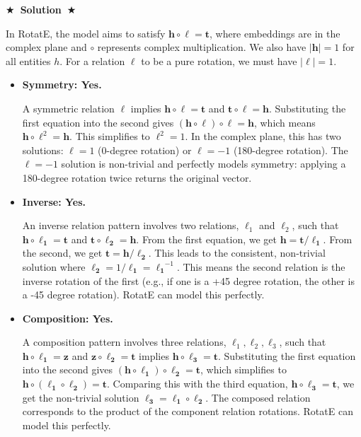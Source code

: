 \documentclass{article}
\numberwithin{figure}{section}
\newcommand{\Solution}[1]{%
    {%
        \medskip
        \color{red}
        \bf $\bigstar$~\sf\textbf{Solution}~$\bigstar$ \sf
        #1
    }
    \bigskip
}
\begin{document}
\Solution{
	In RotatE, the model aims to satisfy $\mathbf{h} \circ \boldsymbol{\ell} = \mathbf{t}$, where embeddings are in the complex plane and $\circ$ represents complex multiplication. We also have $|\mathbf{h}|=1$ for all entities $h$. For a relation $\ell$ to be a pure rotation, we must have $|\boldsymbol{\ell}|=1$.
	
	\begin{itemize}
		\item \textbf{Symmetry: Yes.}
		
		A symmetric relation $\ell$ implies $\mathbf{h} \circ \boldsymbol{\ell} = \mathbf{t}$ and $\mathbf{t} \circ \boldsymbol{\ell} = \mathbf{h}$.
		Substituting the first equation into the second gives $(\mathbf{h} \circ \boldsymbol{\ell}) \circ \boldsymbol{\ell} = \mathbf{h}$, which means $\mathbf{h} \circ \boldsymbol{\ell}^2 = \mathbf{h}$.
		This simplifies to $\boldsymbol{\ell}^2 = 1$. In the complex plane, this has two solutions: $\boldsymbol{\ell} = 1$ (0-degree rotation) or $\boldsymbol{\ell} = -1$ (180-degree rotation). The $\boldsymbol{\ell}=-1$ solution is non-trivial and perfectly models symmetry: applying a 180-degree rotation twice returns the original vector.
		
		\item \textbf{Inverse: Yes.}
		
		An inverse relation pattern involves two relations, $\ell_1$ and $\ell_2$, such that $\mathbf{h} \circ \boldsymbol{\ell_1} = \mathbf{t}$ and $\mathbf{t} \circ \boldsymbol{\ell_2} = \mathbf{h}$.
		From the first equation, we get $\mathbf{h} = \mathbf{t} / \boldsymbol{\ell_1}$. From the second, we get $\mathbf{t} = \mathbf{h} / \boldsymbol{\ell_2}$.
		This leads to the consistent, non-trivial solution where $\boldsymbol{\ell_2} = 1 / \boldsymbol{\ell_1} = \boldsymbol{\ell_1}^{-1}$. This means the second relation is the inverse rotation of the first (e.g., if one is a +45 degree rotation, the other is a -45 degree rotation). RotatE can model this perfectly.
		
		\item \textbf{Composition: Yes.}
		
		A composition pattern involves three relations, $\ell_1, \ell_2, \ell_3$, such that $\mathbf{h} \circ \boldsymbol{\ell_1} = \mathbf{z}$ and $\mathbf{z} \circ \boldsymbol{\ell_2} = \mathbf{t}$ implies $\mathbf{h} \circ \boldsymbol{\ell_3} = \mathbf{t}$.
		Substituting the first equation into the second gives $(\mathbf{h} \circ \boldsymbol{\ell_1}) \circ \boldsymbol{\ell_2} = \mathbf{t}$, which simplifies to $\mathbf{h} \circ (\boldsymbol{\ell_1} \circ \boldsymbol{\ell_2}) = \mathbf{t}$.
		Comparing this with the third equation, $\mathbf{h} \circ \boldsymbol{\ell_3} = \mathbf{t}$, we get the non-trivial solution $\boldsymbol{\ell_3} = \boldsymbol{\ell_1} \circ \boldsymbol{\ell_2}$. The composed relation corresponds to the product of the component relation rotations. RotatE can model this perfectly.
	\end{itemize}
}
\end{document}
